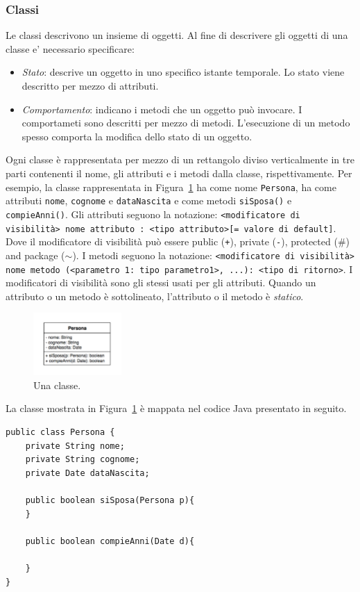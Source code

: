 \documentclass{article}
\begin{document}
\subsubsection{Classi}
Le classi descrivono un insieme di oggetti. Al fine di descrivere gli oggetti di una classe e' necessario specificare:
\begin{itemize}
\item \emph{Stato}: descrive un oggetto in uno specifico istante temporale. Lo stato viene descritto per mezzo di attributi.
\item \emph{Comportamento}: indicano i metodi che un oggetto pu\`o invocare. I comportameti sono descritti per mezzo di metodi. L'esecuzione di un metodo spesso comporta la modifica dello stato di un oggetto.
\end{itemize}
Ogni classe \`e rappresentata per mezzo di un rettangolo diviso verticalmente in tre parti contenenti il nome, gli attributi e
 i metodi dalla classe, rispettivamente.  
 Per esempio, la classe rappresentata in Figura~\ref{Fig:Classe} ha come nome \texttt{Persona}, ha come attributi \texttt{nome}, \texttt{cognome} e \texttt{dataNascita} e come metodi \texttt{siSposa()} e \texttt{compieAnni()}. Gli attributi seguono la notazione: \texttt{<modificatore di visibilit\`a> nome attributo : <tipo attributo>[= valore di default]}. 
Dove il modificatore di visibilit\`a pu\`o essere public (\texttt{+}), private (\texttt{-}), protected ($\#$) and package ($\sim$).
 I metodi seguono la notazione: \texttt{<modificatore di visibilit\`a> nome metodo (<parametro 1: tipo parametro1>, ...): <tipo di ritorno>}.
I modificatori di visibilit\`a sono gli stessi usati per gli attributi. 
Quando un attributo o un metodo \`e sottolineato, l'attributo o il metodo \`e \emph{statico}.
 
 \begin{figure}[h!]
  \centering
    \includegraphics[width=0.3\textwidth]{Img/Persona.pdf}
      \caption{Una classe.}
      \label{Fig:Classe}
\end{figure}

 
La classe mostrata in Figura~\ref{Fig:Classe} \`e mappata nel codice Java presentato in seguito.
\begin{lstlisting}
public class Persona {
    private String nome;
    private String cognome;
    private Date dataNascita;
    
    public boolean siSposa(Persona p){
    }
    
    public boolean compieAnni(Date d){
    
    }
}
\end{lstlisting}
\end{document}

